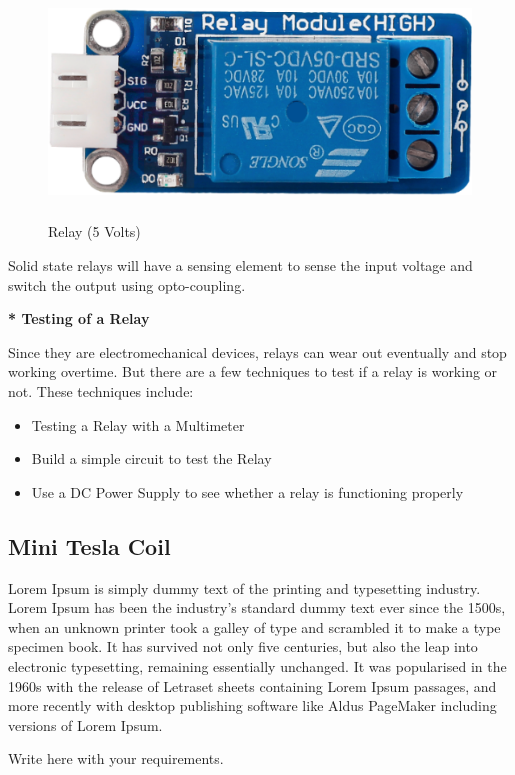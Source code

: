 	\begin{figure}[H]
	\centering
	\includegraphics[width=11.59cm,height=6.16cm]{./images/image5.png}
	\caption{Relay (5 Volts)}
	\label{fig:5_volt_relay}
	\end{figure}
	
	
	\vspace{1\baselineskip}
	Solid state relays will have a sensing element to sense the input voltage and switch the output using opto-coupling.\break
	
  \textbf{* Testing of a Relay}
	

	Since they are electromechanical devices, relays can wear out eventually and stop working overtime. But there are a few techniques to test if a relay is working or not. These techniques include:
	\break
	\begin{itemize}
		\item Testing a Relay with a Multimeter
	
		\item Build a simple circuit to test the Relay
	
		\item Use a DC Power Supply to see whether a relay is functioning properly
	\end{itemize}


\subsection{Mini Tesla Coil}
Lorem Ipsum is simply dummy text of the printing and typesetting industry. Lorem Ipsum has been the industry's standard dummy text ever since the 1500s, when an unknown printer took a galley of type and scrambled it to make a type specimen book. It has survived not only five centuries, but also the leap into electronic typesetting, remaining essentially unchanged. It was popularised in the 1960s with the release of Letraset sheets containing Lorem Ipsum passages, and more recently with desktop publishing software like Aldus PageMaker including versions of Lorem Ipsum.
	\vspace{3\baselineskip}
    \begin{center}
        \Large Write here with your requirements.
    \end{center}
	\vspace{3\baselineskip}
	

